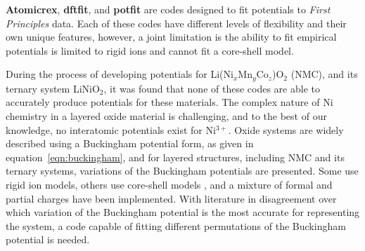 \documentclass[../main.tex]{subfiles}
\begin{document}
\textbf{Atomicrex}, \cite{Stukowski_2017} \textbf{dftfit}, \cite{dftfit} and \textbf{potfit} \cite{wen_kim-compliant_2017, potfit} are codes designed to fit potentials to \textit{First Principles} data. Each of these codes have different levels of flexibility and their own unique features, however, a joint limitation is the ability to fit empirical potentials is limited to rigid ions and cannot fit a core-shell model.

During the process of developing potentials for Li(Ni$_x$Mn$_y$Co$_z$)O$_2$ (NMC), and its ternary system LiNiO$_2$, it was found that none of these codes are able to accurately produce potentials for these materials. The complex nature of Ni chemistry in a layered oxide material is challenging, and to the best of our knowledge, no interatomic potentials exist for Ni$^{3+}$. Oxide systems are widely described using a Buckingham potential form, as given in equation~\ref{eqn:buckingham}, and for layered structures, including NMC and its ternary systems, variations of the Buckingham potentials are presented. Some use rigid ion models,\cite{Lewis_1985, Ledwaba2020, Sayle2005, Dawson0214} others use core-shell models \cite{Hart1998, Fisher2010, Lewis_1985,Ammundsen1999, Kerisit2014, he2019thermal,lee2012atomistic}, and a mixture of formal and partial charges have been implemented. With literature in disagreement over which variation of the Buckingham potential is the most accurate for representing the system, a code capable of fitting different permutations of the Buckingham potential is needed.
\end{document}
